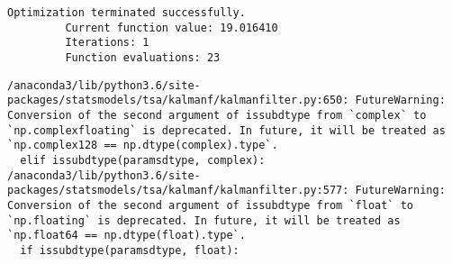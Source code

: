 \documentclass[11pt]{article}
\begin{document}
    \begin{Verbatim}[commandchars=\\\{\}]
Optimization terminated successfully.
         Current function value: 19.016410
         Iterations: 1
         Function evaluations: 23

    \end{Verbatim}

    \begin{Verbatim}[commandchars=\\\{\}]
/anaconda3/lib/python3.6/site-packages/statsmodels/tsa/kalmanf/kalmanfilter.py:650: FutureWarning: Conversion of the second argument of issubdtype from `complex` to `np.complexfloating` is deprecated. In future, it will be treated as `np.complex128 == np.dtype(complex).type`.
  elif issubdtype(paramsdtype, complex):
/anaconda3/lib/python3.6/site-packages/statsmodels/tsa/kalmanf/kalmanfilter.py:577: FutureWarning: Conversion of the second argument of issubdtype from `float` to `np.floating` is deprecated. In future, it will be treated as `np.float64 == np.dtype(float).type`.
  if issubdtype(paramsdtype, float):

    \end{Verbatim}
\end{document}
